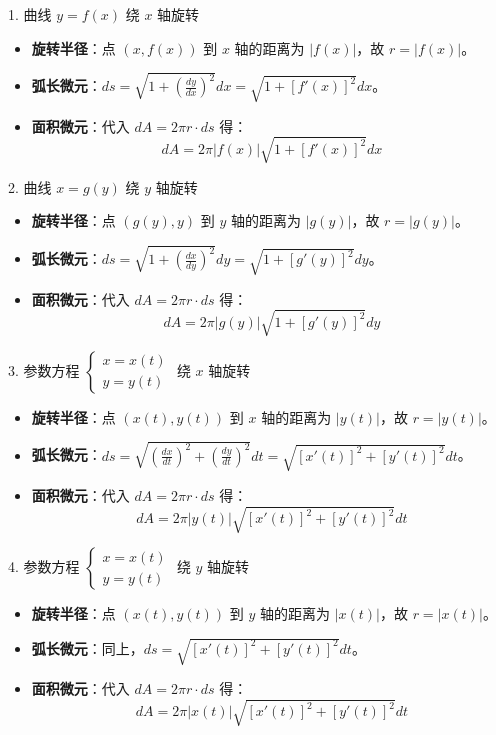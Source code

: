 \documentclass[a4paper,12pt]{ctexart}
\begin{document}
1. 曲线 $y = f(x)$ 绕 $x$ 轴旋转
\begin{itemize}
    \item \textbf{旋转半径}：点 $(x, f(x))$ 到 $x$ 轴的距离为 $|f(x)|$，故 $r = |f(x)|$。
    \item \textbf{弧长微元}：$ds = \sqrt{1 + \left( \frac{dy}{dx} \right)^2} dx = \sqrt{1 + [f'(x)]^2} dx$。
    \item \textbf{面积微元}：代入 $dA = 2\pi r \cdot ds$ 得：
    $$ dA = 2\pi |f(x)| \sqrt{1 + [f'(x)]^2} dx $$
\end{itemize}

2. 曲线 $x = g(y)$ 绕 $y$ 轴旋转
\begin{itemize}
    \item \textbf{旋转半径}：点 $(g(y), y)$ 到 $y$ 轴的距离为 $|g(y)|$，故 $r = |g(y)|$。
    \item \textbf{弧长微元}：$ds = \sqrt{1 + \left( \frac{dx}{dy} \right)^2} dy = \sqrt{1 + [g'(y)]^2} dy$。
    \item \textbf{面积微元}：代入 $dA = 2\pi r \cdot ds$ 得：
    $$ dA = 2\pi |g(y)| \sqrt{1 + [g'(y)]^2} dy $$
\end{itemize}

3. 参数方程 $\begin{cases} x = x(t) \\ y = y(t) \end{cases}$ 绕 $x$ 轴旋转
\begin{itemize}
    \item \textbf{旋转半径}：点 $(x(t), y(t))$ 到 $x$ 轴的距离为 $|y(t)|$，故 $r = |y(t)|$。
    \item \textbf{弧长微元}：$ds = \sqrt{ \left( \frac{dx}{dt} \right)^2 + \left( \frac{dy}{dt} \right)^2 } dt = \sqrt{ [x'(t)]^2 + [y'(t)]^2 } dt$。
    \item \textbf{面积微元}：代入 $dA = 2\pi r \cdot ds$ 得：
    $$ dA = 2\pi |y(t)| \sqrt{ [x'(t)]^2 + [y'(t)]^2 } dt $$
\end{itemize}

4. 参数方程 $\begin{cases} x = x(t) \\ y = y(t) \end{cases}$ 绕 $y$ 轴旋转
\begin{itemize}
    \item \textbf{旋转半径}：点 $(x(t), y(t))$ 到 $y$ 轴的距离为 $|x(t)|$，故 $r = |x(t)|$。
    \item \textbf{弧长微元}：同上，$ds = \sqrt{ [x'(t)]^2 + [y'(t)]^2 } dt$。
    \item \textbf{面积微元}：代入 $dA = 2\pi r \cdot ds$ 得：
    $$ dA = 2\pi |x(t)| \sqrt{ [x'(t)]^2 + [y'(t)]^2 } dt $$
\end{itemize}
\end{document}
